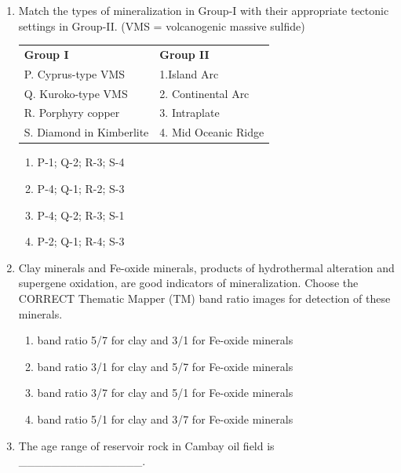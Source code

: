 \documentclass[journal,12pt,onecolumn]{IEEEtran}
\begin{document}
\begin{enumerate}
\begin{enumerate}
\hfill{}


\item Match the types of mineralization in Group-I with their appropriate tectonic settings in Group-II. (VMS = volcanogenic massive sulfide)

\hfill{}
\begin{tabular}{p{} p{}}
\textbf{Group I} & \textbf{Group II} \\
P. Cyprus-type VMS & 1.Island Arc  \\
Q. Kuroko-type VMS & 2. Continental Arc \\
R. Porphyry copper & 3. Intraplate\\
S. Diamond in Kimberlite  & 4.  Mid Oceanic Ridge  \\
\end{tabular}



\begin{multicols}{2}
\begin{enumerate}
\item P-1; Q-2; R-3; S-4
\item P-4; Q-1; R-2; S-3
\item P-4; Q-2; R-3; S-1
\item P-2; Q-1; R-4; S-3
\end{enumerate}
\end{multicols}

\item Clay minerals and Fe-oxide minerals, products of hydrothermal alteration and supergene oxidation, are good indicators of mineralization. Choose the CORRECT Thematic Mapper (TM) band ratio images for detection of these minerals.

\hfill{}


\begin{enumerate}
\item band ratio 5/7 for clay and 3/1 for Fe-oxide minerals
\item band ratio 3/1 for clay and 5/7 for Fe-oxide minerals
\item band ratio 3/7 for clay and 5/1 for Fe-oxide minerals
\item band ratio 5/1 for clay and 3/7 for Fe-oxide minerals
\end{enumerate}


\item The age range of reservoir rock in Cambay oil field is _______________.


\end{enumerate}
\end{enumerate}
\end{document}
